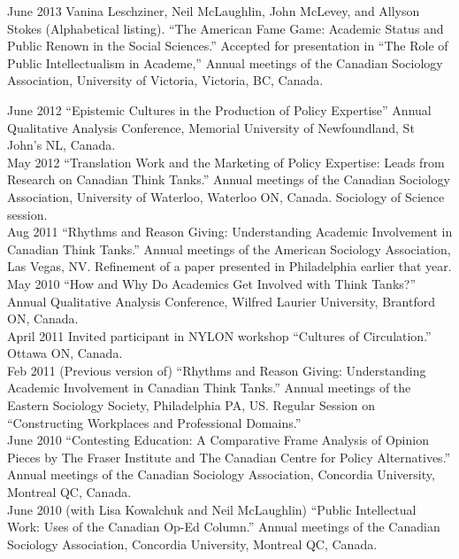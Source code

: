 \documentclass[11pt,usenames,dvipsnames]{article}
\begin{document}
\ind June 2013 Vanina Leschziner, Neil McLaughlin, John McLevey, and Allyson Stokes (Alphabetical listing). ``The American Fame Game: Academic Status and Public Renown in the Social Sciences.'' Accepted for presentation in ``The Role of Public Intellectualism in Academe,'' Annual meetings of the Canadian Sociology Association, University of Victoria, Victoria, BC, Canada. \\


\ind June 2012 ``Epistemic Cultures in the Production of Policy Expertise'' Annual Qualitative Analysis Conference, Memorial University of Newfoundland, St John's NL, Canada.\\

\ind May 2012 ``Translation Work and the Marketing of Policy Expertise: Leads from Research on Canadian Think Tanks.'' Annual meetings of the Canadian Sociology Association, University of Waterloo, Waterloo ON, Canada. Sociology of Science session.\\

\ind Aug 2011 ``Rhythms and Reason Giving: Understanding Academic Involvement in Canadian Think Tanks.'' Annual meetings of the American Sociology Association, Las Vegas, NV. Refinement of a paper presented in Philadelphia earlier that year. \\

\ind May 2010 ``How and Why Do Academics Get Involved with Think Tanks?'' Annual Qualitative Analysis Conference, Wilfred Laurier University, Brantford ON, Canada.\\

\ind April 2011 Invited participant in NYLON workshop ``Cultures of Circulation.'' Ottawa ON, Canada.\\

\ind Feb 2011 (Previous version of) ``Rhythms and Reason Giving: Understanding Academic Involvement in Canadian Think Tanks.'' Annual meetings of the Eastern Sociology Society, Philadelphia PA, US. Regular Session on ``Constructing Workplaces and Professional Domains.''\\

\ind June 2010 ``Contesting Education: A Comparative Frame Analysis of Opinion Pieces by The Fraser Institute and The Canadian Centre for Policy Alternatives.'' Annual meetings  of the Canadian Sociology Association, Concordia University, Montreal QC, Canada.\\

\ind June 2010 (with Lisa Kowalchuk and Neil McLaughlin) ``Public Intellectual Work: Uses of the Canadian Op-Ed Column.'' Annual meetings of the Canadian Sociology Association, Concordia University, Montreal QC, Canada.\\
\end{document}
